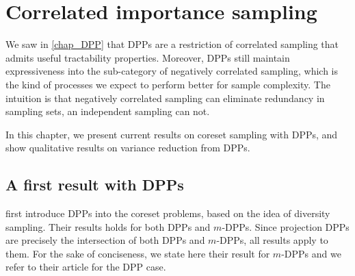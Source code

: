 \chapter{Correlated importance sampling}
\label{chap_correlated_sampling}



We saw in \cref{chap_DPP} that DPPs are a restriction of correlated sampling that admits useful tractability properties. Moreover, DPPs still maintain expressiveness into the sub-category of negatively correlated sampling, which is the kind of processes we expect to perform better for sample complexity. The intuition is that negatively correlated sampling can eliminate redundancy in sampling sets, an independent sampling can not.

In this chapter, we present current results on coreset sampling with DPPs, and show qualitative results on variance reduction from DPPs. 



\section{A first result with DPPs}


\cite{tremblay2018dppcoreset} first introduce DPPs into the coreset problems, based on the idea of diversity sampling. Their results holds for both DPPs and $m$-DPPs. Since projection DPPs are precisely the intersection of both DPPs and $m$-DPPs, all results apply to them. For the sake of conciseness, we state here their result for $m$-DPPs and we refer to their article for the DPP case.

